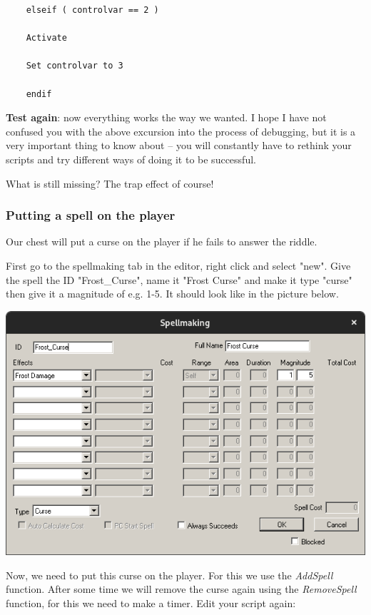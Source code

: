 
\begin{lstlisting}
	elseif ( controlvar == 2 )
	
	Activate
	
	Set controlvar to 3
	
	endif
\end{lstlisting}

\textbf{Test again}: now everything works the way we wanted. I hope I have not confused you with the above excursion into the process of debugging, but it is a very important thing to know about -- you will constantly have to rethink your scripts and try different ways of doing it to be successful.

What is still missing? The trap effect of course!

\hypertarget{putting-a-spell-on-the-player}{%
\subsubsection{Putting a spell on the player}\label{putting-a-spell-on-the-player}}

Our chest will put a curse on the player if he fails to answer the riddle.

First go to the spellmaking tab in the editor, right click and select "new". Give the spell the ID "Frost\_Curse", name it "Frost Curse" and make it type "curse" then give it a magnitude of e.g. 1-5. It should look like in the picture below.

\includegraphics{media/frost-curse.png}

Now, we need to put this curse on the player. For this we use the \emph{AddSpell} function. After some time we will remove the curse again using the \emph{RemoveSpell} function, for this we need to make a timer. Edit your script again:

